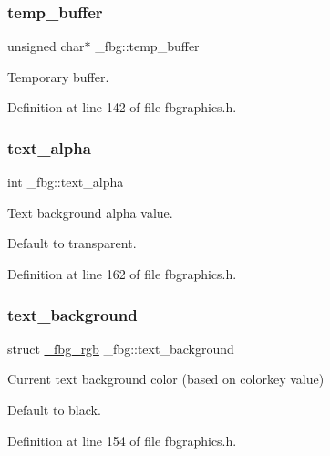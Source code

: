 \subsubsection{\texorpdfstring{temp\+\_\+buffer}{temp\_buffer}}
{\footnotesize\ttfamily unsigned char$\ast$ \+\_\+fbg\+::temp\+\_\+buffer}



Temporary buffer. 



Definition at line 142 of file fbgraphics.\+h.

\mbox{\label{struct__fbg_a870987786121c51135f20b630d731abd}} 
\subsubsection{\texorpdfstring{text\+\_\+alpha}{text\_alpha}}
{\footnotesize\ttfamily int \+\_\+fbg\+::text\+\_\+alpha}



Text background alpha value. 

Default to transparent. 

Definition at line 162 of file fbgraphics.\+h.

\mbox{\label{struct__fbg_afd34a8de5a853e915bd101f11d44cf67}} 
\subsubsection{\texorpdfstring{text\+\_\+background}{text\_background}}
{\footnotesize\ttfamily struct \mbox{\hyperlink{fbgraphics_8h_struct__fbg__rgb}{\+\_\+fbg\+\_\+rgb}} \+\_\+fbg\+::text\+\_\+background}



Current text background color (based on colorkey value) 

Default to black. 

Definition at line 154 of file fbgraphics.\+h.

\mbox{\label{struct__fbg_a4abb858439598b09790ec6d5d8326bb2}} 
